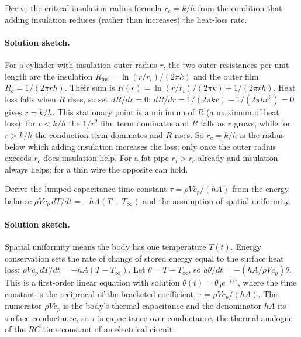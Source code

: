 \begin{exercise}
Derive the critical-insulation-radius formula $r_c = k/h$ from the
condition that adding insulation reduces (rather than increases) the
heat-loss rate.
\paragraph{Solution sketch.} For a cylinder with insulation outer radius
$r$, the two outer resistances per unit length are the insulation
$R_{\text{ins}} = \ln(r/r_i)/(2\pi k)$ and the outer film $R_o = 1/(2\pi
r h)$. Their sum is $R(r) = \ln(r/r_i)/(2\pi k) + 1/(2\pi r h)$. Heat
loss falls when $R$ rises, so set $dR/dr = 0$: $dR/dr = 1/(2\pi k r) -
1/(2\pi h r^2) = 0$ gives $r = k/h$. This stationary point is a minimum
of $R$ (a maximum of heat loss): for $r < k/h$ the $1/r^2$ film term
dominates and $R$ falls as $r$ grows, while for $r > k/h$ the conduction
term dominates and $R$ rises. So $r_c = k/h$ is the radius below which
adding insulation increases the loss; only once the outer radius exceeds
$r_c$ does insulation help. For a fat pipe $r_i > r_c$ already and
insulation always helps; for a thin wire the opposite can hold.
\end{exercise}

\begin{exercise}
Derive the lumped-capacitance time constant $\tau = \rho V c_p/(hA)$
from the energy balance $\rho V c_p\, dT/dt = -hA(T - T_\infty)$ and
the assumption of spatial uniformity.
\paragraph{Solution sketch.} Spatial uniformity means the body has one
temperature $T(t)$. Energy conservation sets the rate of change of
stored energy equal to the surface heat loss: $\rho V c_p\,dT/dt =
-hA(T - T_\infty)$. Let $\theta = T - T_\infty$, so $d\theta/dt =
-(hA/\rho V c_p)\theta$. This is a first-order linear equation with
solution $\theta(t) = \theta_0 e^{-t/\tau}$, where the time constant is
the reciprocal of the bracketed coefficient, $\tau = \rho V c_p/(hA)$.
The numerator $\rho V c_p$ is the body's thermal capacitance and the
denominator $hA$ its surface conductance, so $\tau$ is capacitance over
conductance, the thermal analogue of the $RC$ time constant of an
electrical circuit.
\end{exercise}

